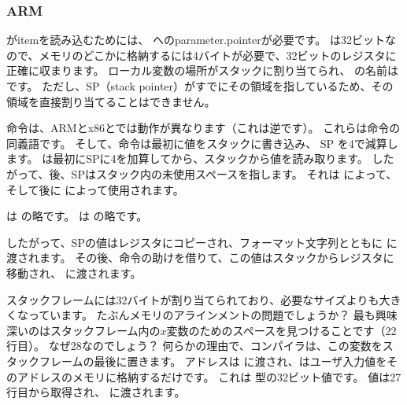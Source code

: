 \subsubsection{ARM}

\myparagraph{\OptimizingKeilVI (\ThumbMode)}



\myindex{\CLanguageElements!\Pointers}

\scanf がitemを読み込むためには、 \Tint へのparameter.pointerが必要です。 
\Tint は32ビットなので、メモリのどこかに格納するには4バイトが必要で、32ビットのレジスタに正確に収まります。 
ローカル変数の場所がスタックに割り当てられ、 
\IDA の名前はです。 ただし、\ac{SP}（\gls{stack pointer}）がすでにその領域を指しているため、その領域を直接割り当てることはできません。 

命令は、ARMとx86とでは動作が異なります（これは逆です）。 
これらは命令の同義語です。 
そして、命令は最初に値をスタックに書き込み、 \ac{SP} を4で減算します。
は最初に\ac{SP}に4を加算してから、スタックから値を読み取ります。 
したがって、後、\ac{SP}はスタック内の未使用スペースを指します。 
それは \scanf によって、そして後に \printf によって使用されます。

 は の略です。
 は の略です。

したがって、\ac{SP}の値はレジスタにコピーされ、フォーマット文字列とともに \scanf に渡されます。 
その後、命令の助けを借りて、この値はスタックからレジスタに移動され、 \printf に渡されます。




スタックフレームには32バイトが割り当てられており、必要なサイズよりも大きくなっています。 たぶんメモリのアラインメントの問題でしょうか？ 
最も興味深いのはスタックフレーム内の$x$変数のためのスペースを見つけることです（22行目）。 
なぜ28なのでしょう？ 何らかの理由で、コンパイラは、この変数をスタックフレームの最後に置きます。 
アドレスは \scanf に渡され、\scanf はユーザ入力値をそのアドレスのメモリに格納するだけです。 
これは \Tint 型の32ビット値です。 
値は27行目から取得され、 \printf に渡されます。

